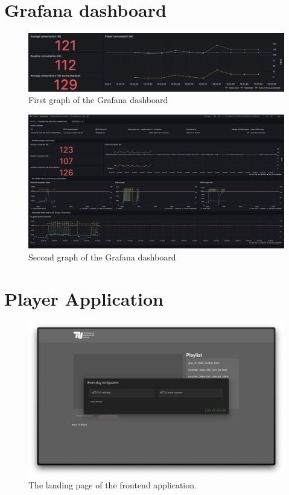 \begin{appendices}

\section{Grafana dashboard}
\label{dash1}

\begin{figure}[ht]
    \centering
    \includegraphics[width=1\linewidth]{assets/dashboard1.png}
    \caption{First graph of the Grafana dashboard}
    \label{fig:dash1}
\end{figure}

\begin{figure}[ht]
    \centering
    \includegraphics[width=1\linewidth]{assets/dashboard2.png}
    \caption{Second graph of the Grafana dashboard}
    \label{fig:dash2}
\end{figure}

\section{Player Application}

 \begin{figure}[ht]
     \centering
     \includegraphics[width=0.8\linewidth]{assets/mediaplayer1.png}
     \caption{The landing page of the frontend application.}
     \label{fig:media_player1}
 \end{figure}


\end{appendices}

